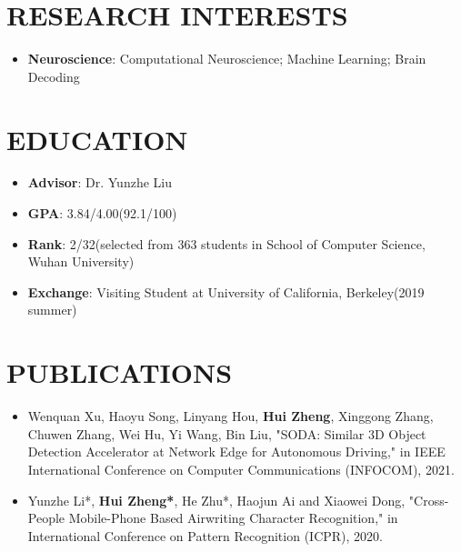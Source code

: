 \documentclass{resume}
\begin{document}


\section{{\bfseries RESEARCH INTERESTS}}
\begin{itemize}[parsep=0.2ex]
  \item \textbf{Neuroscience}: Computational Neuroscience; Machine Learning; Brain Decoding
\end{itemize}

\section{{\bfseries EDUCATION}}
\begin{itemize}[parsep=0.1ex]
  \item \textbf{Advisor}: Dr. Yunzhe Liu
\end{itemize}
\begin{itemize}[parsep=0.1ex]
  \item \textbf{GPA}: 3.84/4.00(92.1/100)
  \item \textbf{Rank}: 2/32(selected from 363 students in School of Computer Science, Wuhan University)
  \item \textbf{Exchange}: Visiting Student at University of California, Berkeley(2019 summer)
\end{itemize}

\section{{\bfseries PUBLICATIONS}}
\begin{itemize}[parsep=0.2ex]
  \item Wenquan Xu, Haoyu Song, Linyang Hou, \textbf{Hui Zheng}, Xinggong Zhang, Chuwen Zhang, Wei Hu, Yi Wang, Bin Liu, "SODA: Similar 3D Object Detection Accelerator at Network Edge for Autonomous Driving," in IEEE International Conference on Computer Communications (INFOCOM), 2021.
  \item Yunzhe Li*, \textbf{Hui Zheng*}, He Zhu*, Haojun Ai and Xiaowei Dong, "Cross-People Mobile-Phone Based Airwriting Character Recognition," in International Conference on Pattern Recognition (ICPR), 2020.
\end{itemize}
\end{document}

